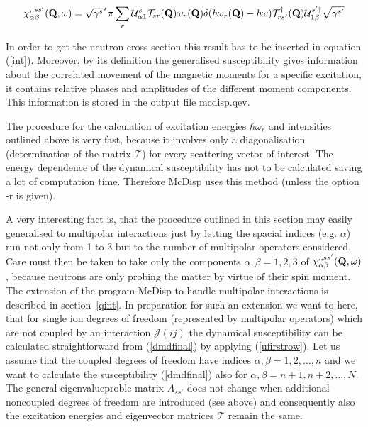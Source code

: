 \begin{equation}\label{dmdfinal}
\chi^{,,ss'}_{\alpha\beta}(\mbf Q,\omega)=\sqrt{\gamma^s}^\star\pi \sum_r 
\mathcal U^s_{\alpha1} \mathcal T_{sr}(\mbf Q) \omega_r(\mbf Q)\delta(\hbar \omega_r(\mbf Q) %
- \hbar \omega) \mathcal T^{\dag}_{rs'}(\mbf Q) \mathcal U^{s'\dag}_{1\beta}\sqrt{\gamma^{s'}} 
\end{equation}

In order to get the neutron cross section this result has to be inserted in equation (\ref{int}).
Moreover, by its definition the generalised susceptibility gives information about the correlated
movement of the magnetic moments for a specific excitation, it contains relative phases and amplitudes of the 
different moment components. This information is stored in the output file {\prg mcdisp.qev}.

The procedure for the calculation of excitation energies $\hbar\omega_r$ and intensities outlined above is very fast, %
because it
involves only a diagonalisation (determination of the matrix $\mathcal T$) for every scattering vector of interest. The 
energy dependence of the dynamical susceptibility has not to be calculated saving a lot of computation time. Therefore %
{\prg McDisp}
uses this method (unless the option {\prg -r} is given).

A very interesting fact is, that the procedure outlined in this section may easily generalised to multipolar %
interactions just by
letting the spacial indices (e.g. $\alpha$) run not only from 1 to 3 but to the number of multipolar operators %
considered. 
Care must then be taken to take only the components $\alpha,\beta=1,2,3$ of $\chi^{,,ss'}_{\alpha\beta}(\mathbf Q,\omega)$, %
because
neutrons are only probing the matter by virtue of their spin moment. The extension of the program {\prg McDisp} to %
handle
multipolar interactions is described in section~\ref{qint}. In preparation for such an extension we want to here, that
for single ion degrees of freedom (represented by multipolar operators)
 which are not coupled by an interaction $\mathcal J(ij)$ the dynamical susceptibility can be calculated straightforward
from (\ref{dmdfinal}) by applying (\ref{ufirstrow}). Let us assume that the coupled degrees of freedom
have indices $\alpha,\beta=1,2,...,n$ and we want to calculate the susceptibility (\ref{dmdfinal})
 also for $\alpha,\beta=n+1,n+2,...,N$. The general eigenvalueproble matrix $A_{ss'}$
does not change when additional noncoupled degrees of freedom are introduced (see above) and consequently also
the excitation energies and eigenvector matrices $\mathcal T$ remain the same. 


